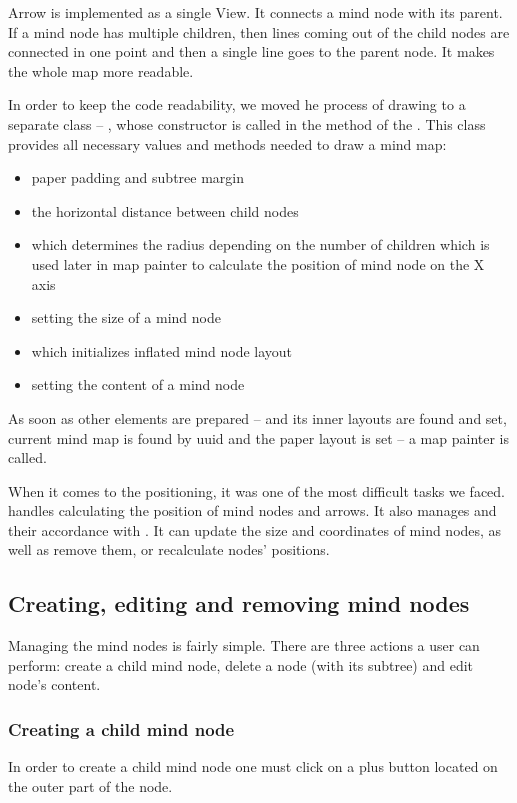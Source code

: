 Arrow is implemented as a single View. It connects a mind node with its parent. If a mind node has multiple children, then lines coming out of the child nodes are connected in one point and then a single line goes to the parent node. It makes the whole map more readable. 

In order to keep the code readability, we moved he process of drawing to a separate class -- , whose constructor is called in the  method of the . This class provides all necessary values and methods needed to draw a mind map:
\begin{itemize}
	\item paper padding and  subtree margin
	\item the horizontal distance between child nodes
	\item {} which determines the radius depending on the number of children which is used later in map painter to calculate the position of mind node on the X axis
	\item {} setting the size of a mind node
	\item {} which initializes inflated mind node layout  
	\item {} setting the content of a mind node
\end{itemize}
 As soon as other elements are prepared --   and its inner  layouts are found and set, current mind map is found by uuid and the paper layout is set -- a map painter is called. 

When it comes to the positioning, it was one of the most difficult tasks we faced.  handles calculating the position of mind nodes and arrows. It also manages  and their accordance with . It can update the size and coordinates of mind nodes, as well as remove them, or recalculate nodes' positions. 

\subsection{Creating, editing and removing mind nodes}
\label{subsec:drawing}
Managing the mind nodes is fairly simple. There are three actions a user can perform:  create a child mind node, delete a node (with its subtree) and edit node's content. 

\subsubsection{Creating a child mind node}
\label{subsubsec:create-child}
In order to create a child mind node one must click on a plus button located on the outer part of the node.

